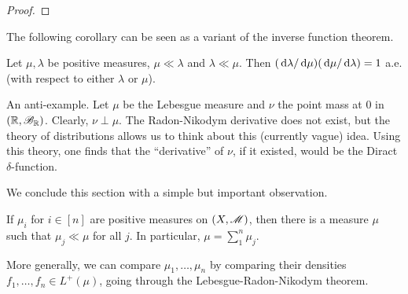 \documentclass[12pt]{article} %
\begin{document}
\begin{proof}
\end{proof}

\noindent The following corollary can be seen as a variant of the inverse function theorem.

\begin{corollary}
    Let $\mu, \lambda$ be positive measures, $\mu \ll \lambda$ and $\lambda \ll \mu$. Then $(\, \mathrm{d}\lambda/\, \mathrm{d}\mu)(\, \mathrm{d}\mu/\, \mathrm{d}\lambda) = 1$ a.e. (with respect to either $\lambda$ or $\mu$).
\end{corollary}

\begin{example}
    An anti-example. Let $\mu$ be the Lebesgue measure and $\nu$ the point mass at 0 in $(\mathbb{R}, \mathscr{B}_{\mathbb{R}})$. Clearly, $\nu \perp \mu$. The Radon-Nikodym derivative does not exist, but the theory of distributions allows us to think about this (currently vague) idea. Using this theory, one finds that the ``derivative'' of $\nu$, if it existed, would be the Diract $\delta$-function.
\end{example}

We conclude this section with a simple but important observation. 

\begin{proposition}\label{prop:3.11}
    If $\mu_i$ for $i \in [n]$ are positive measures on $(X, \mathscr{M})$, then there is a measure $\mu$ such that $\mu_j \ll \mu$ for all $j$. In particular, $\mu = \sum_1^n \mu_j$.
\end{proposition}

\begin{remark}
    More generally, we can compare $\mu_1, \ldots, \mu_n$ by comparing their densities $f_1, \ldots, f_n \in L^+(\mu)$, going through the Lebesgue-Radon-Nikodym theorem.
\end{remark}
\end{document}
